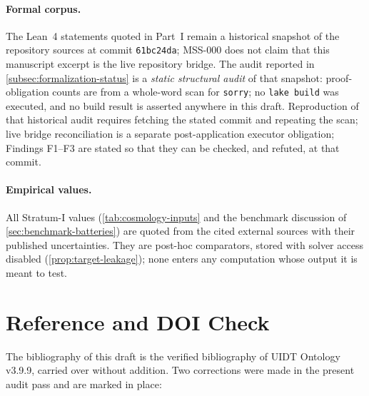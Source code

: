 \documentclass[12pt,a4paper,twoside]{article}
\theoremstyle{plain}
\theoremstyle{definition}
\theoremstyle{remark}
\begin{document}
\paragraph{Formal corpus.}
The Lean~4 statements quoted in Part~I remain a historical snapshot of the
repository sources at commit \texttt{61bc24da}; MSS-000 does not claim that
this manuscript excerpt is the live repository bridge. The audit reported in
\cref{subsec:formalization-status} is a \emph{static structural audit}
of that snapshot: proof-obligation counts are from a whole-word scan for
\texttt{sorry}; no \texttt{lake build} was executed, and no build result
is asserted anywhere in this draft. Reproduction of that historical audit requires fetching the stated commit
and repeating the scan; live bridge reconciliation is a separate
post-application executor obligation; Findings F1--F3 are stated so that
they can be checked, and refuted, at that commit.

\paragraph{Empirical values.}
All Stratum-I values (\cref{tab:cosmology-inputs} and the benchmark
discussion of \cref{sec:benchmark-batteries}) are quoted from the cited
external sources with their published uncertainties. They are post-hoc
comparators, stored with solver access disabled
(\cref{prop:target-leakage}); none enters any computation whose output
it is meant to test.

\section{Reference and DOI Check}
\label{sec:doi-check}

\noindent The bibliography of this draft is the verified bibliography of
UIDT Ontology v3.9.9, carried over without addition. Two corrections
were made in the present audit pass and are marked in place:
\end{document}
